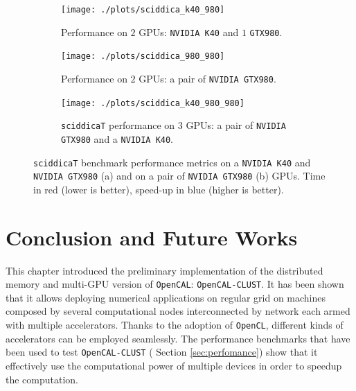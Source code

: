\begin{figure}
	\vspace{-0.5cm}
	\begin{subfigure}{1.0\textwidth}
	
		\texttt{[image: ./plots/sciddica\_k40\_980]}
			\caption{Performance on $2$ GPUs: \texttt{NVIDIA K40} and $1$ \texttt{GTX980}.}
		\label{fig:sciddica_k40_980}
	\end{subfigure}        
	\endminipage \hfill

	\begin{subfigure}{1.0\textwidth}
		\texttt{[image: ./plots/sciddica\_980\_980]}
		\caption{Performance on $2$ GPUs: a pair of \texttt{NVIDIA GTX980}.}
		\label{fig:sciddica_980_980}
	\end{subfigure}
	\endminipage\hfill
	\begin{subfigure}{1.0\textwidth}
		\texttt{[image: ./plots/sciddica\_k40\_980\_980]}
		\caption[\texttt{sciddicaT} performance on $3$ GPUs.]{\texttt{sciddicaT} performance on $3$ GPUs: a pair of \texttt{NVIDIA GTX980} and a \texttt{NVIDIA K40}.}
		\label{fig:sciddica_k40_980_980}
	\end{subfigure}
	\endminipage\hfill
	
	\caption[\texttt{sciddicaT} benchmark performance metrics.]{\texttt{sciddicaT} benchmark performance metrics on a \texttt{NVIDIA K40} and \texttt{NVIDIA GTX980} (a) and on  a pair of \texttt{NVIDIA GTX980} (b) GPUs. Time in red (lower is better), speed-up in blue (higher is better).}
	\label{fig:sciddica_performance}
\end{figure}

\section{Conclusion and Future Works}
This chapter introduced the preliminary implementation of the distributed memory and multi-GPU  version of \texttt{OpenCAL}: \texttt{OpenCAL-CLUST}.
It has been shown that it allows deploying numerical applications on regular grid on machines composed by several computational nodes interconnected by network each armed with multiple accelerators. Thanks to the adoption of \texttt{OpenCL}, different kinds of accelerators can be employed seamlessly.
The performance benchmarks that have been used to test \texttt{OpenCAL-CLUST} ( Section \ref{sec:perfomance}) show that it effectively use the computational power of multiple devices in order to speedup the computation.


